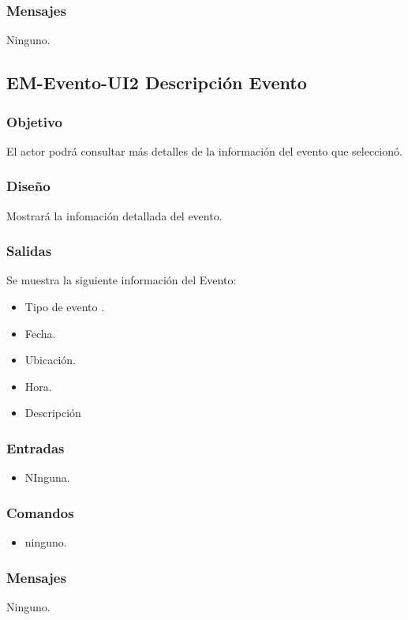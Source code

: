 \subsubsection{Mensajes}
\begin{Citemize}
	\item Ninguno.
\end{Citemize}


\subsection{EM-Evento-UI2 Descripción Evento}

\subsubsection{Objetivo}
	El actor podrá consultar más detalles de la información del evento que seleccionó.

\subsubsection{Diseño}
	Mostrará la infomación detallada del evento. 


\subsubsection{Salidas}
	Se muestra la siguiente información del Evento:
	\begin{itemize}
		\item Tipo de evento .
		\item Fecha.
		\item Ubicación.
		\item Hora.
		\item Descripción
	\end{itemize}

\subsubsection{Entradas}

\begin{itemize}
	\item NInguna.
\end{itemize}

\subsubsection{Comandos}
\begin{itemize}
	
	\item ninguno.
	\
\end{itemize}

\subsubsection{Mensajes}
\begin{Citemize}
	\item Ninguno.
\end{Citemize}
